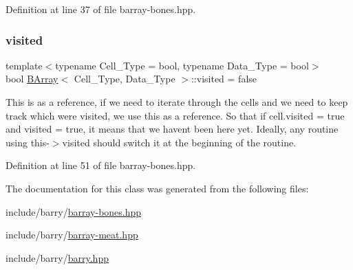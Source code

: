 Definition at line 37 of file barray-\/bones.\+hpp.

\mbox{\label{class_b_array_ae0860bf21425397d1498f94da6518e85}} 
\subsubsection{\texorpdfstring{visited}{visited}}
{\footnotesize\ttfamily template$<$typename Cell\+\_\+\+Type = bool, typename Data\+\_\+\+Type = bool$>$ \\
bool \hyperlink{class_b_array}{B\+Array}$<$ Cell\+\_\+\+Type, Data\+\_\+\+Type $>$\+::visited = false}

This is as a reference, if we need to iterate through the cells and we need to keep track which were visited, we use this as a reference. So that if cell.\+visited = true and visited = true, it means that we haven\textquotesingle{}t been here yet. Ideally, any routine using this-\/$>$visited should switch it at the beginning of the routine. 

Definition at line 51 of file barray-\/bones.\+hpp.



The documentation for this class was generated from the following files\+:\begin{DoxyCompactItemize}
\item 
include/barry/\hyperlink{barray-bones_8hpp}{barray-\/bones.\+hpp}\item 
include/barry/\hyperlink{barray-meat_8hpp}{barray-\/meat.\+hpp}\item 
include/barry/\hyperlink{barry_8hpp}{barry.\+hpp}\end{DoxyCompactItemize}
